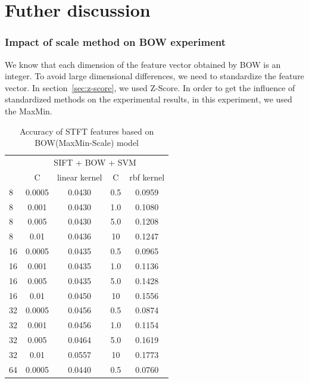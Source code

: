 \documentclass[conference]{IEEEtran}
\begin{document}
\section{Futher discussion}
\subsubsection{Impact of scale method on BOW experiment}
We know that each dimension of the feature vector obtained by BOW is an integer. To avoid large dimensional differences, we need to standardize the feature vector. In section~\ref{sec:z-score}, we used Z-Score. In order to get the influence of standardized methods on the experimental results, in this experiment, we used the MaxMin.

\begin{table}[htbp]
	\centering
	\newcommand{\tabincell}[2]{\begin{tabular}{@{}#1@{}}#2\end{tabular}}
	\renewcommand\arraystretch{1.0}
	\caption{Accuracy of STFT features based on BOW(MaxMin-Scale) model}
	\label{base6}%
	\begin{tabular}{@{}p{1cm}<{\centering}|c|c|c|c}
		\hline
		\multirow{2}{*}{\diagbox[height=2\line,width=1.42cm,font=\tiny]{$k$}{Acc.}{$\mathit{M}$}} &
		\multicolumn{4}{c}{SIFT + BOW + SVM}\\
		\cline{2-5}
		& {C} & {linear kernel} & {C} & {rbf kernel}\\
		\hline
		8   & 0.0005 & 0.0430 & 0.5 & 0.0959\\
		8   & 0.001 & 0.0430 & 1.0 & 0.1080\\
		8   & 0.005 & 0.0430 & 5.0 & 0.1208\\
        8   & 0.01  & 0.0436 & 10 & 0.1247\\
        \hline
		16   & 0.0005  & 0.0435 & 0.5 & 0.0965\\
		16   & 0.001  & 0.0435 & 1.0 & 0.1136\\
		16   & 0.005  & 0.0435 & 5.0 & 0.1428\\
        16   & 0.01  & 0.0450 & 10 & 0.1556\\
        \hline
		32   & 0.0005  & 0.0456 & 0.5 & 0.0874\\
		32   & 0.001  & 0.0456 & 1.0 & 0.1154\\
		32   & 0.005  & 0.0464 & 5.0 & 0.1619\\
        32   & 0.01  & 0.0557 & 10 & 0.1773\\
        \hline
		64   & 0.0005  & 0.0440 & 0.5 & 0.0760\\

\end{tabular}
\end{table}
\end{document}
